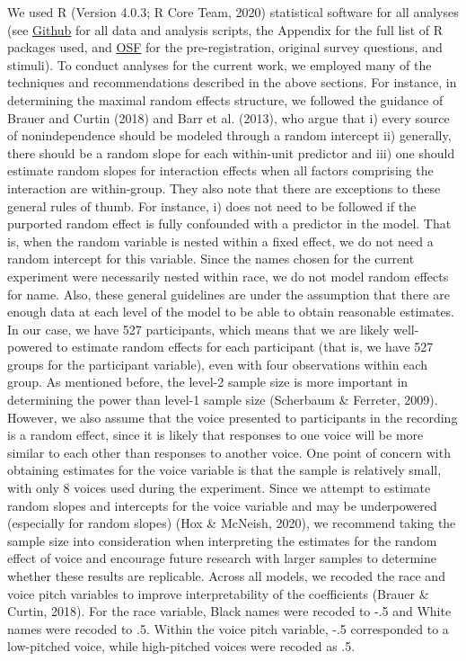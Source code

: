 \documentclass[
  english,
  man, noextraspace,floatsintext]{apa6}
\begin{document}
We used R (Version 4.0.3; R Core Team, 2020) statistical software for all analyses (see \href{https://github.com/keanarichards/stats-masters}{Github} for all data and analysis scripts, the Appendix for the full list of R packages used, and \href{https://osf.io/r8m2u/}{OSF} for the pre-registration, original survey questions, and stimuli). To conduct analyses for the current work, we employed many of the techniques and recommendations described in the above sections. For instance, in determining the maximal random effects structure, we followed the guidance of Brauer and Curtin (2018) and Barr et al. (2013), who argue that i) every source of nonindependence should be modeled through a random intercept ii) generally, there should be a random slope for each within-unit predictor and iii) one should estimate random slopes for interaction effects when all factors comprising the interaction are within-group. They also note that there are exceptions to these general rules of thumb. For instance, i) does not need to be followed if the purported random effect is fully confounded with a predictor in the model. That is, when the random variable is nested within a fixed effect, we do not need a random intercept for this variable. Since the names chosen for the current experiment were necessarily nested within race, we do not model random effects for name. Also, these general guidelines are under the assumption that there are enough data at each level of the model to be able to obtain reasonable estimates. In our case, we have 527 participants, which means that we are likely well-powered to estimate random effects for each participant (that is, we have 527 groups for the participant variable), even with four observations within each group. As mentioned before, the level-2 sample size is more important in determining the power than level-1 sample size (Scherbaum \& Ferreter, 2009). However, we also assume that the voice presented to participants in the recording is a random effect, since it is likely that responses to one voice will be more similar to each other than responses to another voice. One point of concern with obtaining estimates for the voice variable is that the sample is relatively small, with only 8 voices used during the experiment. Since we attempt to estimate random slopes and intercepts for the voice variable and may be underpowered (especially for random slopes) (Hox \& McNeish, 2020), we recommend taking the sample size into consideration when interpreting the estimates for the random effect of voice and encourage future research with larger samples to determine whether these results are replicable. Across all models, we recoded the race and voice pitch variables to improve interpretability of the coefficients (Brauer \& Curtin, 2018). For the race variable, Black names were recoded to -.5 and White names were recoded to .5. Within the voice pitch variable, -.5 corresponded to a low-pitched voice, while high-pitched voices were recoded as .5.
\end{document}
